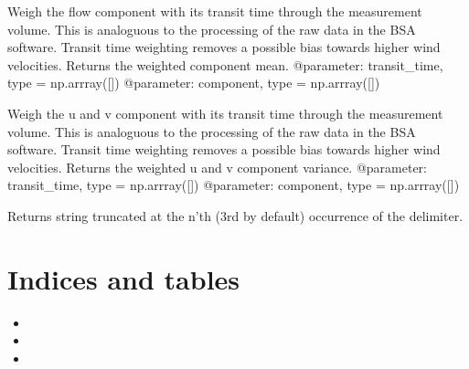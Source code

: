 \documentclass[letterpaper,10pt,english]{sphinxmanual}
\begin{document}

\begin{fulllineitems}
\label{\detokenize{index:windtunnel.transit_time_weighted_mean}}
Weigh the flow component with its transit time through the
measurement volume. This is analoguous to the processing of the raw
data in the BSA software. Transit time weighting removes a possible
bias towards higher wind velocities. Returns the weighted component mean.
@parameter: transit\_time, type = np.arrray({[}{]})
@parameter: component,  type = np.arrray({[}{]})

\end{fulllineitems}


\begin{fulllineitems}
\label{\detokenize{index:windtunnel.transit_time_weighted_var}}
Weigh the u and v component with its transit time through the
measurement volume. This is analoguous to the processing of the raw
data in the BSA software. Transit time weighting removes a possible
bias towards higher wind velocities. Returns the weighted u and v
component variance.
@parameter: transit\_time, type = np.arrray({[}{]})
@parameter: component,  type = np.arrray({[}{]})

\end{fulllineitems}


\begin{fulllineitems}
\label{\detokenize{index:windtunnel.trunc_at}}
Returns string truncated at the n’th (3rd by default) occurrence of the
delimiter.

\end{fulllineitems}



\chapter{Indices and tables}
\label{\detokenize{index:indices-and-tables}}\begin{itemize}
\item {} 

\item {} 

\item {} 

\end{itemize}
\end{document}
